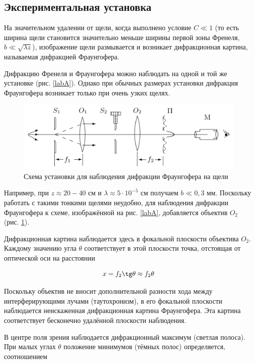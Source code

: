 \documentclass[a4paper,12pt]{article}
\begin{document}
\subsection{Экспериментальная установка}

На значительном удалении от щели, когда выполнено условие $ C \ll 1 $
(то есть ширина щели становится значительно меньше ширины первой
зоны Френеля, $ b \ll \sqrt{\lambda z} $), изображение щели размывается и возникает
дифракционная картина, называемая дифракцией Фраунгофера.

Дифракцию Френеля и Фраунгофера можно наблюдать на одной
и той же установке (рис. \ref{labA}). Однако при обычных размерах установки дифракция Фраунгофера возникает только при очень узких щелях.

\begin{figure}[h!]
	\centering
	\includegraphics[width=0.8\linewidth]{b.png}
	\caption{Схема установки для наблюдения дифракции Фраунгофера на щели}
	\label{labB}
\end{figure}

Например, при $ z \approx  20-40 $  см и $  \lambda \approx 5 \cdot 10^{-5}  $   см получаем $  b \ll 0,3 $ мм. Поскольку работать с такими тонкими щелями неудобно, для наблюдения дифракции Фраунгофера к схеме, изображённой на рис. \ref{labA}, добавляется объектив $ O_2  $ (рис. \ref{labB}).

Дифракционная картина наблюдается здесь в фокальной плоскости
объектива $ O_2 $. Каждому значению угла $ \theta $ соответствует в этой плоскости точка, отстоящая от оптической оси на расстоянии

\begin{equation}\label{x}
x = f_2 \tg \theta \approx f_2 \theta
\end{equation}

Поскольку объектив не вносит дополнительной разности хода
между интерферирующими лучами (таутохронизм), в его фокальной
плоскости наблюдается неискаженная дифракционная картина Фраунгофера. Эта картина соответствует бесконечно удалённой плоскости
наблюдения.

В центре поля зрения наблюдается дифракционный максимум (светлая полоса). При малых углах $ \theta $ положение минимумов (тёмных полос)
определяется, соотношением
\end{document}
